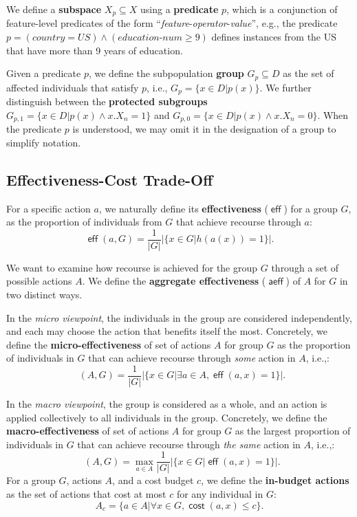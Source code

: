 \documentclass{article}
\DeclareMathOperator{\cost}{\mathsf{cost}}
\DeclareMathOperator{\eff}{\mathsf{eff}}
\DeclareMathOperator{\aeff}{\mathsf{aeff}}
\DeclareMathOperator{\aeffmi}{\mathsf{aeff_{\mu}}}
\DeclareMathOperator{\aeffma}{\mathsf{aeff_M}}
\begin{document}
We define a \textbf{subspace} $X_p \subseteq X$ using a \textbf{predicate} $p$, which is a conjunction of feature-level predicates of the form ``\emph{feature}-\emph{operator}-\emph{value}'', e.g., the predicate $p = (\textit{country}=\textit{US}) \land (\textit{education-num}\ge 9)$ defines instances from the US that have more than 9 years of education.


Given a predicate $p$, we define the subpopulation \textbf{group} $G_p \subseteq D$ as the set of affected individuals that satisfy $p$, i.e., $G_p = \{x \in D | p(x) \}$. We further distinguish between the \textbf{protected subgroups} $G_{p,1} = \{x \in D | p(x) \land x.X_n=1 \}$ and $G_{p,0} = \{x \in D | p(x) \land x.X_n=0 \}$. When the predicate $p$ is understood, we may omit it in the designation of a group to simplify notation. 


\subsection{Effectiveness-Cost Trade-Off}
\label{sec:def:tradeoff}

For a specific action $a$, we naturally define its \textbf{effectiveness} ($\eff$) for a group $G$, as the proportion of individuals from $G$ that achieve recourse through $a$: 
%
\[
\eff(a,G) = \frac{1}{|G|} | \{x \in G | h(a(x)) = 1 \} |.
\]

We want to examine how recourse is achieved for the group $G$ through a set of possible actions $A$. We define the \textbf{aggregate effectiveness} ($\aeff$) of $A$ for $G$ in two distinct ways.

In the \emph{micro viewpoint}, the individuals in the group are considered independently, and each may choose the action that benefits itself the most.
Concretely, we define the \textbf{micro-effectiveness} of set of actions $A$ for group $G$ as the proportion of individuals in $G$ that can achieve recourse through \emph{some} action in $A$, i.e.,:
%
\[
\aeffmi(A,G) = \frac{1}{|G|} | \{x \in G | \exists a \in A, \eff(a,x) = 1 \} |.
\]

In the \emph{macro viewpoint}, the group is considered as a whole, and an action is applied collectively to all individuals in the group.
Concretely, we define the \textbf{macro-effectiveness} of set of actions $A$ for group $G$ as the largest proportion of individuals in $G$ that can achieve recourse through \emph{the same} action in $A$, i.e.,: 
%
\[
\aeffma(A,G) =  \max_{a \in A} \frac{1}{|G|} | \{x \in G | \eff(a,x) = 1 \} |.
\]
For a group $G$, actions $A$, and a cost budget $c$, we define the \textbf{in-budget actions} as the set of actions that cost at most $c$ for any individual in $G$:
\[
A_c = \{ a \in A | \forall x \in G, \cost(a,x) \le c \}.
\]
\end{document}
